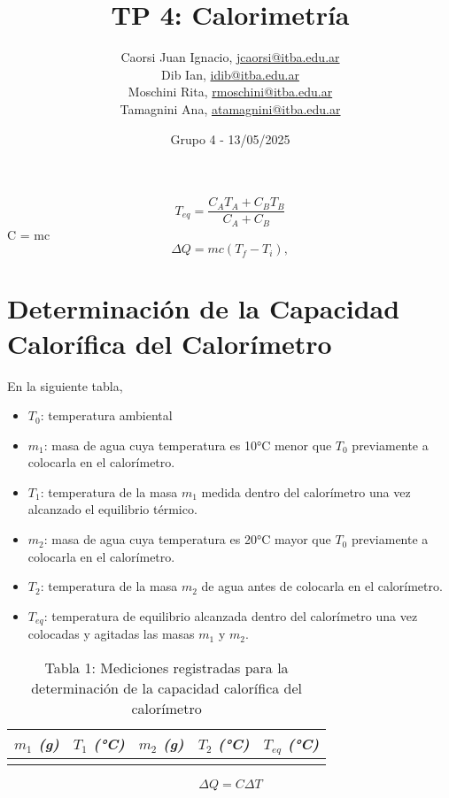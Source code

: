 \documentclass[12pt, a4paper]{article}
\title{TP 4: Calorimetría}
\author
{
  Caorsi Juan Ignacio, \href{jcaorsi@itba.edu.ar}{jcaorsi@itba.edu.ar} \\
  Dib Ian, \href{idib@itba.edu.ar}{idib@itba.edu.ar} \\
  Moschini Rita, \href{rmoschini@itba.edu.ar}{rmoschini@itba.edu.ar} \\
  Tamagnini Ana, \href{atamagnini@itba.edu.ar}{atamagnini@itba.edu.ar}
}
\date{Grupo 4 - 13/05/2025}
\begin{document}
\maketitle

\begin{equation}
    T_{eq} = \frac{C_A T_A + C_B T_B}{C_A + C_B}
\end{equation}
C = mc
\begin{equation}
    \Delta Q = mc (T_f - T_i),
\end{equation}



\section{Determinación de la Capacidad Calorífica del Calorímetro}
En la siguiente tabla,
\begin{itemize}
    \item $T_0$: temperatura ambiental
    \item $m_1$: masa de agua cuya temperatura es 10°C menor que $T_0$ previamente a colocarla en el calorímetro.
    \item $T_1$: temperatura de la masa $m_1$ medida dentro del calorímetro una vez alcanzado el equilibrio térmico.
    \item $m_2$: masa de agua cuya temperatura es 20°C mayor que $T_0$ previamente a colocarla en el calorímetro.
    \item $T_2$: temperatura de la masa $m_2$ de agua antes de colocarla en el calorímetro.
    \item $T_{eq}$: temperatura de equilibrio alcanzada dentro del calorímetro una vez colocadas y agitadas las masas $m_1$ y $m_2$.
\end{itemize}
\begin{table}[h!]
\centering
\begin{tabular}{|c|c|c|c|c|}
\hline
\textit{$m_1$ (g)} & \textit{$T_1$ (°C)} & \textit{$m_2$ (g)} & \textit{$T_2$ (°C)} & \textit{$T_{eq}$ (°C)} \\
\hline
& & & & \\
\hline
\end{tabular}
\caption{Tabla 1: Mediciones registradas para la determinación de la capacidad calorífica del calorímetro}
\end{table}

\begin{equation}
    \Delta Q = C \Delta T
\end{equation}
\end{document}
